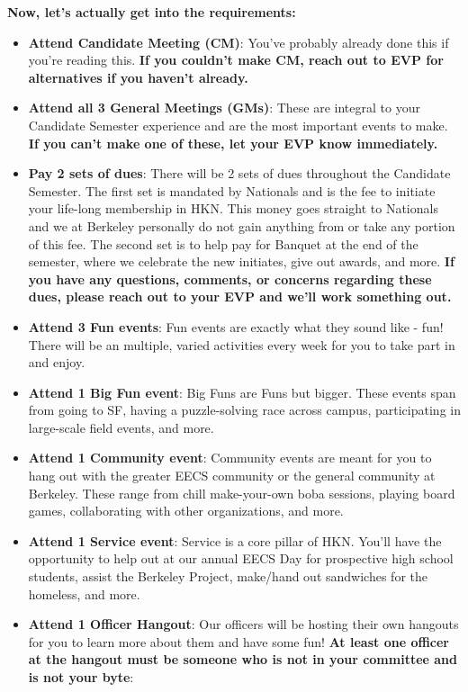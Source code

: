 \documentclass[11pt, article, oneside]{memoir}
\begin{document}
        \textbf{Now, let's actually get into the requirements:}
            \begin{itemize}
                \item \textbf{Attend Candidate Meeting (CM)}: You've probably already done this if you're reading this. \textbf{If you couldn't make CM, reach out to EVP for alternatives if you haven't already.}
                \item \textbf{Attend all 3 General Meetings (GMs)}: These are integral to your Candidate Semester experience and are the most important events to make. \textbf{If you can't make one of these, let your EVP know immediately.}
                \item \textbf{Pay 2 sets of dues}: There will be 2 sets of dues throughout the Candidate Semester. The first set is mandated by Nationals and is the fee to initiate your life-long membership in HKN. This money goes straight to Nationals and we at Berkeley personally do not gain anything from or take any portion of this fee. The second set is to help pay for Banquet at the end of the semester, where we celebrate the new initiates, give out awards, and more. \textbf{If you have any questions, comments, or concerns regarding these dues, please reach out to your EVP and we'll work something out.}
                \item \textbf{Attend 3 Fun events}: Fun events are exactly what they sound like - fun! There will be an multiple, varied activities every week for you to take part in and enjoy.
                \item \textbf{Attend 1 Big Fun event}: Big Funs are Funs but bigger. These events span from going to SF, having a puzzle-solving race across campus, participating in large-scale field events, and more.
                \item \textbf{Attend 1 Community event}: Community events are meant for you to hang out with the greater EECS community or the general community at Berkeley. These range from chill make-your-own boba sessions, playing board games, collaborating with other organizations, and more.
                \item \textbf{Attend 1 Service event}: Service is a core pillar of HKN. You'll have the opportunity to help out at our annual EECS Day for prospective high school students, assist the Berkeley Project, make/hand out sandwiches for the homeless, and more.
                \item \textbf{Attend 1 Officer Hangout}: Our officers will be hosting their own hangouts for you to learn more about them and have some fun! \textbf{At least one officer at the hangout must be someone who is not in your committee and is not your byte}:

\end{itemize}
\end{document}
